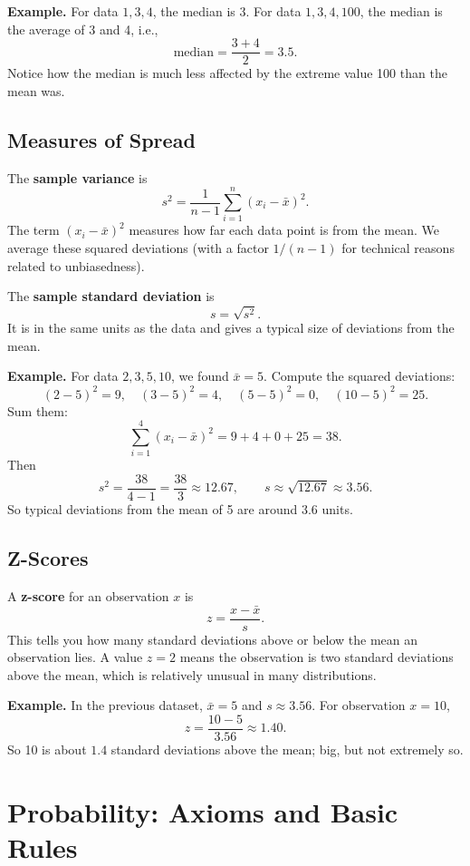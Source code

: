 \documentclass[11pt,a4paper]{article}
\begin{document}
\textbf{Example.}  
For data \(1, 3, 4\), the median is 3.  
For data \(1, 3, 4, 100\), the median is the average of 3 and 4, i.e.,
\[
\text{median} = \frac{3+4}{2} = 3.5.
\]
Notice how the median is much less affected by the extreme value 100 than the mean was.

\subsection{Measures of Spread}

The \textbf{sample variance} is
\[
s^2 = \frac{1}{n-1}\sum_{i=1}^{n} (x_i - \bar{x})^2.
\]
The term \((x_i - \bar{x})^2\) measures how far each data point is from the mean.  
We average these squared deviations (with a factor \(1/(n-1)\) for technical reasons related to unbiasedness).

The \textbf{sample standard deviation} is
\[
s = \sqrt{s^2}.
\]
It is in the same units as the data and gives a typical size of deviations from the mean.

\textbf{Example.}  
For data \(2, 3, 5, 10\), we found \(\bar{x} = 5\).  
Compute the squared deviations:
\[
(2-5)^2 = 9,\quad (3-5)^2 = 4,\quad (5-5)^2 = 0,\quad (10-5)^2 = 25.
\]
Sum them:
\[
\sum_{i=1}^{4} (x_i - \bar{x})^2 = 9 + 4 + 0 + 25 = 38.
\]
Then
\[
s^2 = \frac{38}{4-1} = \frac{38}{3} \approx 12.67,\qquad
s \approx \sqrt{12.67} \approx 3.56.
\]
So typical deviations from the mean of 5 are around 3.6 units.

\subsection{Z-Scores}

A \textbf{z-score} for an observation \(x\) is
\[
z = \frac{x - \bar{x}}{s}.
\]
This tells you how many standard deviations above or below the mean an observation lies.  
A value \(z = 2\) means the observation is two standard deviations above the mean, which is relatively unusual in many distributions.

\textbf{Example.}  
In the previous dataset, \(\bar{x} = 5\) and \(s \approx 3.56\).  
For observation \(x = 10\),
\[
z = \frac{10 - 5}{3.56} \approx 1.40.
\]
So 10 is about \(1.4\) standard deviations above the mean; big, but not extremely so.

\newpage

\section{Probability: Axioms and Basic Rules}
\end{document}
